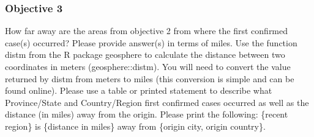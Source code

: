 \documentclass[
]{article}
\begin{document}
\hypertarget{objective-3}{%
\subsubsection{Objective 3}\label{objective-3}}

How far away are the areas from objective 2 from where the first
confirmed case(s) occurred? Please provide answer(s) in terms of miles.
Use the function distm from the R package geosphere to calculate the
distance between two coordinates in meters (geosphere::distm). You will
need to convert the value returned by distm from meters to miles (this
conversion is simple and can be found online). Please use a table or
printed statement to describe what Province/State and Country/Region
first confirmed cases occurred as well as the distance (in miles) away
from the origin. Please print the following: \{recent region\} is
\{distance in miles\} away from \{origin city, origin country\}.
\end{document}
